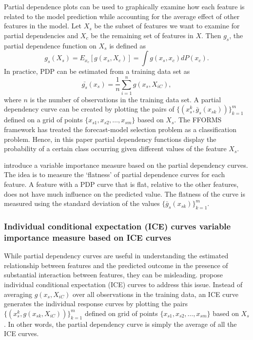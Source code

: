 \documentclass[11pt,a4paper,]{article}
\begin{document}
Partial dependence plots can be used to graphically examine how each feature is related to the model prediction while accounting for the average effect of other features in the model. Let \(X_s\) be the subset of features we want to examine for partial dependencies and \(X_c\) be the remaining set of features in \(X\). Then \(g_s\), the partial dependence function on \(X_s\) is defined as
\[g_s(X_s)=E_{x_c}[g(x_s, X_c)]=\int{g(x_s, x_c)dP(x_c).}\]
In practice, PDP can be estimated from a training data set as
\[\bar{g_s}(x_s)=\frac{1}{n}\sum_{i=1}^{n}g(x_s, X_{iC}),\]
where \(n\) is the number of observations in the training data set. A partial dependency curve can be created by plotting the pairs of \(\{(x_s^k, \bar{g}_s(x_{sk}))\}_{k=1}^{m}\) defined on a grid of points \(\{x_{s1}, x_{s2},\dots, x_{sm}\}\) based on \(X_s\). The FFORMS framework has treated the forecast-model selection problem as a classification problem. Hence, in this paper partial dependency functions display the probability of a certain class occurring given different values of the feature \(X_s\).

\textcite{Greenwell2018} introduce a variable importance measure based on the partial dependency curves. The idea is to measure the `flatness' of partial dependence curves for each feature. A feature with a PDP curve that is flat, relative to the other features, does not have much influence on the predicted value. The flatness of the curve is measured using the standard deviation of the values \(\{\bar{g}_{s}(x_{sk})\}_{k=1}^{m}\).

\hypertarget{individual-conditional-expectation-ice-curves-variable-importance-measure-based-on-ice-curves}{%
\subsubsection{Individual conditional expectation (ICE) curves variable importance measure based on ICE curves}\label{individual-conditional-expectation-ice-curves-variable-importance-measure-based-on-ice-curves}}

While partial dependency curves are useful in understanding the estimated relationship between features and the predicted outcome in the presence of substantial interaction between features, they can be misleading. \textcite{goldstein2015peeking} propose individual conditional expectation (ICE) curves to address this issue. Instead of
averaging \(g(x_s, X_{iC})\) over all observations in the training data, an ICE curve generates the individual response curves by plotting the pairs \(\{(x_s^k, g(x_{sk}, X_{iC}))\}_{k=1}^{m}\) defined on grid of points \(\{x_{s1}, x_{s2},\dots, x_{sm}\}\) based on \(X_s\). In other words, the partial dependency curve is simply the average of all the ICE curves.
\end{document}
